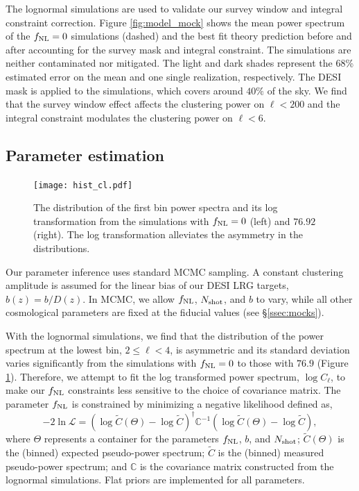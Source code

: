 The lognormal simulations are used to validate our survey window and integral constraint correction. Figure \ref{fig:model_mock} shows the mean power spectrum of the $f_{\rm NL}=0$ simulations (dashed) and the best fit theory prediction before and after accounting for the survey mask and integral constraint. The simulations are neither contaminated nor mitigated. The light and dark shades represent the 68\% estimated error on the mean and one single realization, respectively. The DESI mask is applied to the simulations, which covers around $40\%$ of the sky. We find that the survey window effect affects the clustering power on $\ell < 200$ and the integral constraint modulates the clustering power on $\ell < 6$.

\subsection{Parameter estimation}

\begin{figure}
\centering
\texttt{[image: hist\_cl.pdf]}
\caption{The distribution of the first bin power spectra and its log transformation from the simulations with $f_{\rm NL}=0$ (left) and $76.92$ (right). The log transformation alleviates the asymmetry in the distributions.}\label{fig:histcell}
\end{figure}

Our parameter inference uses standard MCMC sampling. A constant clustering amplitude is assumed for the linear bias of our DESI LRG targets, $b(z) = b/D(z)$. In MCMC, we allow $f_{\rm NL}$, $N_{\rm shot}$, and $b$ to vary, while all other cosmological parameters are fixed at the fiducial values (see \S \ref{ssec:mocks}). 

With the lognormal simulations, we find that the distribution of the power spectrum at the lowest bin, $2\leq \ell < 4$, is asymmetric and its standard deviation varies significantly from the simulations with $f_{\rm NL}=0$ to those with $76.9$ (Figure \ref{fig:histcell}). Therefore, we attempt to fit the log transformed power spectrum, $\log C_{\ell}$, to make our $f_{\rm NL}$ constraints less sensitive to the choice of covariance matrix. The parameter $f_{\rm NL}$ is constrained by minimizing a negative likelihood defined as,
\begin{equation}
-2\ln\mathcal{L} = (\log \tilde{C}(\Theta)-\log \tilde{C})^{\dagger} \mathbb{C}^{-1} (\log \tilde{C}(\Theta)-\log \tilde{C}),
\end{equation}
where $\Theta$ represents a container for the parameters $f_{\rm NL}$, $b$, and $N_{\rm shot}$; $\tilde{C}(\Theta)$ is the (binned) expected pseudo-power spectrum; $\tilde{C}$ is the (binned) measured pseudo-power spectrum; and $\mathbb{C}$ is the covariance matrix constructed from the lognormal simulations. Flat priors are implemented for all parameters.


